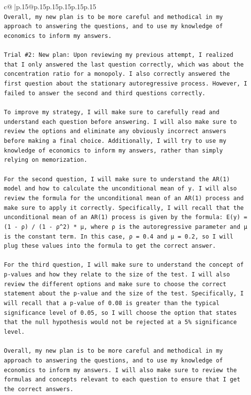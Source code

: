 \documentclass{article}
\begin{document}
{\begin{supertabular}{c@{$\;$}|p{.15\linewidth}@{}p{.15\linewidth}p{.15\linewidth}p{.15\linewidth}p{.15\linewidth}p{.15\linewidth}}
{{{\\ 
\texttt{Overall, my new plan is to be more careful and methodical in my approach to answering the questions, and to use my knowledge of economics to inform my answers.} \\
\\ 
\texttt{Trial \#2: New plan: Upon reviewing my previous attempt, I realized that I only answered the last question correctly, which was about the concentration ratio for a monopoly. I also correctly answered the first question about the stationary autoregressive process. However, I failed to answer the second and third questions correctly.} \\
\\ 
\texttt{To improve my strategy, I will make sure to carefully read and understand each question before answering. I will also make sure to review the options and eliminate any obviously incorrect answers before making a final choice. Additionally, I will try to use my knowledge of economics to inform my answers, rather than simply relying on memorization.} \\
\\ 
\texttt{For the second question, I will make sure to understand the AR(1) model and how to calculate the unconditional mean of y. I will also review the formula for the unconditional mean of an AR(1) process and make sure to apply it correctly. Specifically, I will recall that the unconditional mean of an AR(1) process is given by the formula: E(y) = (1 {-} ρ) / (1 {-} ρ\^{}2) * μ, where ρ is the autoregressive parameter and μ is the constant term. In this case, ρ = 0.4 and μ = 0.2, so I will plug these values into the formula to get the correct answer.} \\
\\ 
\texttt{For the third question, I will make sure to understand the concept of p{-}values and how they relate to the size of the test. I will also review the different options and make sure to choose the correct statement about the p{-}value and the size of the test. Specifically, I will recall that a p{-}value of 0.08 is greater than the typical significance level of 0.05, so I will choose the option that states that the null hypothesis would not be rejected at a 5\% significance level.} \\
\\ 
\texttt{Overall, my new plan is to be more careful and methodical in my approach to answering the questions, and to use my knowledge of economics to inform my answers. I will also make sure to review the formulas and concepts relevant to each question to ensure that I get the correct answers.} \\
}}}
\end{supertabular}}
\end{document}
